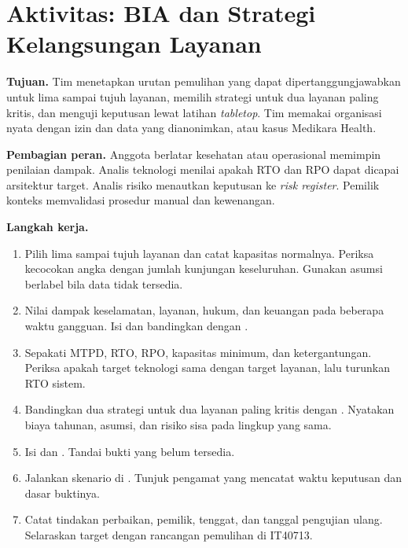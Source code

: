 \section{Aktivitas: BIA dan Strategi Kelangsungan Layanan}

\textbf{Tujuan.} Tim menetapkan urutan pemulihan yang dapat dipertanggungjawabkan untuk lima sampai
tujuh layanan, memilih strategi untuk dua layanan paling kritis, dan menguji keputusan lewat latihan
\textit{tabletop}. Tim memakai organisasi nyata dengan izin dan data yang dianonimkan, atau kasus
Medikara Health.

\textbf{Pembagian peran.} Anggota berlatar kesehatan atau operasional memimpin penilaian dampak.
Analis teknologi menilai apakah RTO dan RPO dapat dicapai arsitektur target. Analis risiko menautkan
keputusan ke \textit{risk register}. Pemilik konteks memvalidasi prosedur manual dan kewenangan.

\textbf{Langkah kerja.}
\begin{enumerate}
  \item Pilih lima sampai tujuh layanan dan catat kapasitas normalnya. Periksa kecocokan angka
  dengan jumlah kunjungan keseluruhan. Gunakan asumsi berlabel bila data tidak tersedia.
  \item Nilai dampak keselamatan, layanan, hukum, dan keuangan pada beberapa waktu gangguan. Isi
   dan bandingkan dengan
  .
  \item Sepakati MTPD, RTO, RPO, kapasitas minimum, dan ketergantungan. Periksa apakah target
  teknologi sama dengan target layanan, lalu turunkan RTO sistem.
  \item Bandingkan dua strategi untuk dua layanan paling kritis dengan
  . Nyatakan biaya tahunan, asumsi, dan risiko
  sisa pada lingkup yang sama.
  \item Isi  dan
  . Tandai bukti yang belum tersedia.
  \item Jalankan skenario di . Tunjuk
  pengamat yang mencatat waktu keputusan dan dasar buktinya.
  \item Catat tindakan perbaikan, pemilik, tenggat, dan tanggal pengujian ulang. Selaraskan target
  dengan rancangan pemulihan di IT40713.
\end{enumerate}


